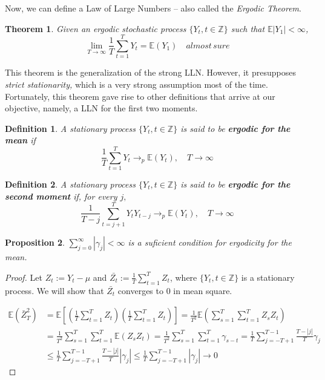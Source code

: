 \documentclass[11pt, a4paper]{report}
\theoremstyle{plain}
\newtheorem{thm}{Theorem}[section]
\newtheorem{prop}[thm]{Proposition}
\theoremstyle{plain}
\newtheorem{defn}{Definition}[section]
\theoremstyle{remark}
\begin{document}
Now, we can define a Law of Large Numbers -- also called the \textit{Ergodic Theorem}.

\begin{thm}
	Given an ergodic stochastic process $\{Y_t, t \in \mathbb{Z} \}$ such that $\mathbb{E}|Y_1| < \infty$,
	$$\lim_{T \rightarrow \infty} \dfrac{1}{T} \sum_{t=1}^T Y_t = \mathbb{E}(Y_1) \hspace{1em} almost \, sure$$
\end{thm}

This theorem is the generalization of the strong LLN. However, it presupposes \textit{strict stationarity,} which is a very strong assumption most of the time. Fortunately, this theorem gave rise to other definitions that arrive at our objective, namely, a LLN for the first two moments.

\begin{defn}
	A stationary process $\{Y_t, t \in \mathbb{Z} \}$ is said to be \textbf{ergodic for the mean} if
	$$ \dfrac{1}{T} \sum_{t=1}^T Y_t \to_p \mathbb{E}(Y_t), \hspace{1em} T \to \infty $$
\end{defn}

\begin{defn}
	A stationary process $\{Y_t, t \in \mathbb{Z} \}$ is said to be \textbf{ergodic for the second moment} if, for every $j,$
	$$ \dfrac{1}{T-j} \sum_{t=j+1}^T Y_t Y_{t-j} \to_p \mathbb{E}(Y_t), \hspace{1em} T \to \infty $$
\end{defn}

\begin{prop} \label{sum-ergodicity}
	$\sum_{j=0}^{\infty} |\gamma_j| < \infty $ is a suficient condition for ergodicity for the mean.
\end{prop}

\begin{proof}
	Let $Z_t := Y_t - \mu$ and $\bar{Z_t} := \frac{1}{T} \sum_{t=1}^T Z_t$, where $\{Y_t, t \in \mathbb{Z} \}$ is a stationary process. We will show that $\bar{Z_t}$ converges to 0 in mean square.
	
	\begin{math}
		\begin{aligned}
			\mathbb{E}\left(\bar{Z}_{T}^{2}\right) &=\mathbb{E}\left[\left(\frac{1}{T} \sum_{t=1}^{T} Z_{t}\right)\left(\frac{1}{T} \sum_{t=1}^{T} Z_{t}\right)\right]=\frac{1}{T^{2}} \mathbb{E}\left(\sum_{s=1}^{T} \sum_{t=1}^{T} Z_{s} Z_{t}\right) \\
			&=\frac{1}{T^{2}} \sum_{s=1}^{T} \sum_{t=1}^{T} \mathbb{E}\left(Z_{s} Z_{t}\right)=\frac{1}{T^{2}} \sum_{s=1}^{T} \sum_{t=1}^{T} \gamma_{s-t}=\frac{1}{T} \sum_{j=-T+1}^{T-1} \frac{T-|j|}{T} \gamma_{j} \\
			& \leq \frac{1}{T} \sum_{j=-T+1}^{T-1} \frac{T-|j|}{T}\left|\gamma_{j}\right| \leq \frac{1}{T} \sum_{j=-T+1}^{T-1}\left|\gamma_{j}\right| \rightarrow 0
		\end{aligned}
	\end{math} 

\end{proof}
\end{document}
